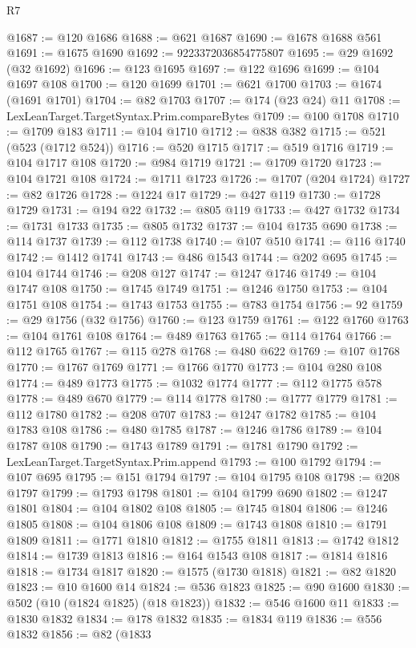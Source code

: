 \begin{lexlean}{R7}
\begin{coremodule}
@1687 := @120 @1686
@1688 := @621 @1687
@1690 := @1678 @1688 @561
@1691 := @1675 @1690
@1692 := 9223372036854775807
@1695 := @29 @1692 (@32 @1692)
@1696 := @123 @1695
@1697 := @122 @1696
@1699 := @104 @1697 @108
@1700 := @120 @1699
@1701 := @621 @1700
@1703 := @1674 (@1691 @1701)
@1704 := @82 @1703
@1707 := @174 (@23 @24) @11
@1708 := LexLeanTarget.TargetSyntax.Prim.compareBytes
@1709 := @100 @1708
@1710 := @1709 @183
@1711 := @104 @1710
@1712 := @838 @382
@1715 := @521 (@523 (@1712 @524))
@1716 := @520 @1715
@1717 := @519 @1716
@1719 := @104 @1717 @108
@1720 := @984 @1719
@1721 := @1709 @1720
@1723 := @104 @1721 @108
@1724 := @1711 @1723
@1726 := @1707 (@204 @1724)
@1727 := @82 @1726
@1728 := @1224 @17
@1729 := @427 @119
@1730 := @1728 @1729
@1731 := @194 @22
@1732 := @805 @119
@1733 := @427 @1732
@1734 := @1731 @1733
@1735 := @805 @1732
@1737 := @104 @1735 @690
@1738 := @114 @1737
@1739 := @112 @1738
@1740 := @107 @510
@1741 := @116 @1740
@1742 := @1412 @1741
@1743 := @486 @1543
@1744 := @202 @695
@1745 := @104 @1744
@1746 := @208 @127
@1747 := @1247 @1746
@1749 := @104 @1747 @108
@1750 := @1745 @1749
@1751 := @1246 @1750
@1753 := @104 @1751 @108
@1754 := @1743 @1753
@1755 := @783 @1754
@1756 := 92
@1759 := @29 @1756 (@32 @1756)
@1760 := @123 @1759
@1761 := @122 @1760
@1763 := @104 @1761 @108
@1764 := @489 @1763
@1765 := @114 @1764
@1766 := @112 @1765
@1767 := @115 @278
@1768 := @480 @622
@1769 := @107 @1768
@1770 := @1767 @1769
@1771 := @1766 @1770
@1773 := @104 @280 @108
@1774 := @489 @1773
@1775 := @1032 @1774
@1777 := @112 @1775 @578
@1778 := @489 @670
@1779 := @114 @1778
@1780 := @1777 @1779
@1781 := @112 @1780
@1782 := @208 @707
@1783 := @1247 @1782
@1785 := @104 @1783 @108
@1786 := @480 @1785
@1787 := @1246 @1786
@1789 := @104 @1787 @108
@1790 := @1743 @1789
@1791 := @1781 @1790
@1792 := LexLeanTarget.TargetSyntax.Prim.append
@1793 := @100 @1792
@1794 := @107 @695
@1795 := @151 @1794
@1797 := @104 @1795 @108
@1798 := @208 @1797
@1799 := @1793 @1798
@1801 := @104 @1799 @690
@1802 := @1247 @1801
@1804 := @104 @1802 @108
@1805 := @1745 @1804
@1806 := @1246 @1805
@1808 := @104 @1806 @108
@1809 := @1743 @1808
@1810 := @1791 @1809
@1811 := @1771 @1810
@1812 := @1755 @1811
@1813 := @1742 @1812
@1814 := @1739 @1813
@1816 := @164 @1543 @108
@1817 := @1814 @1816
@1818 := @1734 @1817
@1820 := @1575 (@1730 @1818)
@1821 := @82 @1820
@1823 := @10 @1600 @14
@1824 := @536 @1823
@1825 := @90 @1600
@1830 := @502 (@10 (@1824 @1825) (@18 @1823))
@1832 := @546 @1600 @11
@1833 := @1830 @1832
@1834 := @178 @1832
@1835 := @1834 @119
@1836 := @556 @1832
@1856 := @82
    (@1833

\end{coremodule}
\end{lexlean}
